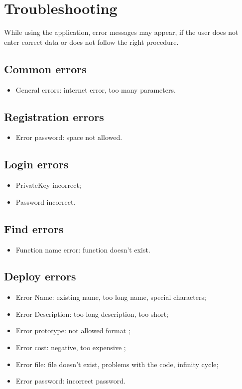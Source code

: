 \section{Troubleshooting}
While using the application, error messages may appear, if the user does not enter correct data or does not follow the right procedure. 
\subsection{Common errors}
\begin{itemize}
	\item General errors: internet error, too many parameters.
\end{itemize}
\subsection{Registration errors}
\begin{itemize}
	\item Error password: space not allowed.
\end{itemize}
\subsection{Login errors}
\begin{itemize}
	\item PrivateKey incorrect;
	\item Password incorrect.
\end{itemize}
\subsection{Find errors}
\begin{itemize}
	\item Function name error: function doesn't exist.
\end{itemize}
\subsection{Deploy errors}
\begin{itemize}
	\item Error Name: existing name, too long name, special characters;
	\item Error Description: too long description, too short;
	\item Error prototype: not allowed format ;
	\item Error cost: negative, too expensive ;
	\item Error file: file doesn't exist, problems with the code, infinity cycle;
	\item Error password: incorrect password.
\end{itemize}
